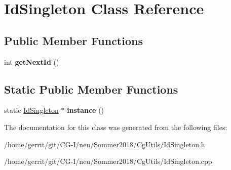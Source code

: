 \hypertarget{class_id_singleton}{}\section{Id\+Singleton Class Reference}
\label{class_id_singleton}
\subsection*{Public Member Functions}
\begin{DoxyCompactItemize}
\item 
\mbox{\label{class_id_singleton_a491ca9caa8546ff3c86c4779e2e8879e}} 
int {\bfseries get\+Next\+Id} ()
\end{DoxyCompactItemize}
\subsection*{Static Public Member Functions}
\begin{DoxyCompactItemize}
\item 
\mbox{\label{class_id_singleton_abfad167f11e3a4854ea9980047dae3af}} 
static \hyperlink{class_id_singleton}{Id\+Singleton} $\ast$ {\bfseries instance} ()
\end{DoxyCompactItemize}


The documentation for this class was generated from the following files\+:\begin{DoxyCompactItemize}
\item 
/home/gerrit/git/\+C\+G-\/\+I/neu/\+Sommer2018/\+Cg\+Utils/Id\+Singleton.\+h\item 
/home/gerrit/git/\+C\+G-\/\+I/neu/\+Sommer2018/\+Cg\+Utils/Id\+Singleton.\+cpp\end{DoxyCompactItemize}
